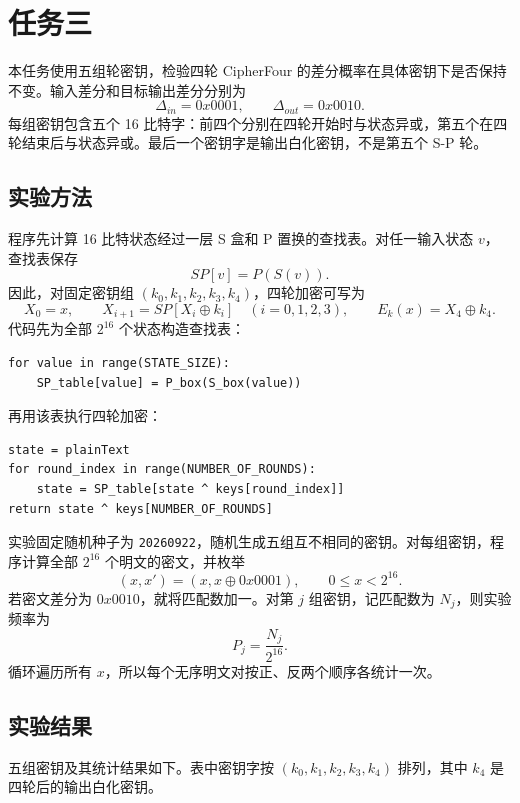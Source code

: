 \section{任务三}

本任务使用五组轮密钥，检验四轮 CipherFour 的差分概率在具体密钥下是否保持不变。输入差分和目标输出差分分别为
\[
    \Delta_{in}=0x0001,\qquad \Delta_{out}=0x0010.
\]
每组密钥包含五个 16 比特字：前四个分别在四轮开始时与状态异或，第五个在四轮结束后与状态异或。最后一个密钥字是输出白化密钥，不是第五个 S-P 轮。

\subsection{实验方法}

程序先计算 16 比特状态经过一层 S 盒和 P 置换的查找表。对任一输入状态 $v$，查找表保存
\[
    SP[v]=P(S(v)).
\]
因此，对固定密钥组 $(k_0,k_1,k_2,k_3,k_4)$，四轮加密可写为
\[
    X_0=x,\qquad
    X_{i+1}=SP[X_i\oplus k_i]\quad (i=0,1,2,3),\qquad
    E_k(x)=X_4\oplus k_4.
\]
代码先为全部 $2^{16}$ 个状态构造查找表：
\begin{lstlisting}
for value in range(STATE_SIZE):
    SP_table[value] = P_box(S_box(value))
\end{lstlisting}
再用该表执行四轮加密：
\begin{lstlisting}
state = plainText
for round_index in range(NUMBER_OF_ROUNDS):
    state = SP_table[state ^ keys[round_index]]
return state ^ keys[NUMBER_OF_ROUNDS]
\end{lstlisting}

实验固定随机种子为 \texttt{20260922}，随机生成五组互不相同的密钥。对每组密钥，程序计算全部 $2^{16}$ 个明文的密文，并枚举
\[
    (x,x')=(x,x\oplus 0x0001),\qquad 0\le x<2^{16}.
\]
若密文差分为 $0x0010$，就将匹配数加一。对第 $j$ 组密钥，记匹配数为 $N_j$，则实验频率为
\[
    P_j=\frac{N_j}{2^{16}}.
\]
循环遍历所有 $x$，所以每个无序明文对按正、反两个顺序各统计一次。

\subsection{实验结果}

五组密钥及其统计结果如下。表中密钥字按 $(k_0,k_1,k_2,k_3,k_4)$ 排列，其中 $k_4$ 是四轮后的输出白化密钥。

